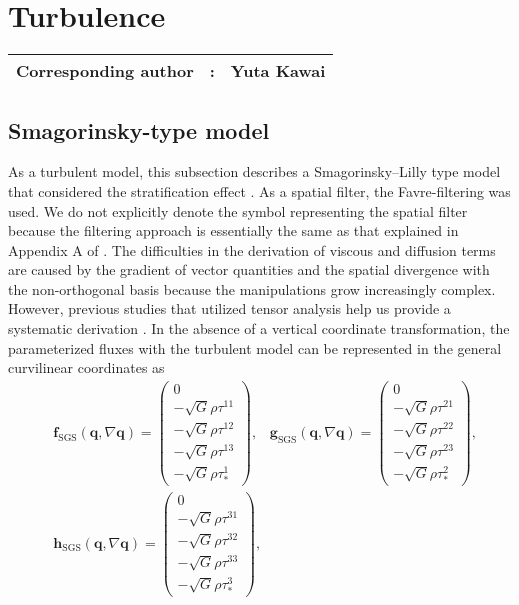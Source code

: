 \section{Turbulence}\label{sec:turbulence}
{\bf \Large
\begin{tabular}{ccc}
\hline
  Corresponding author & : & Yuta Kawai\\
\hline
\end{tabular}
}

\subsection{Smagorinsky-type model}
As a turbulent model, 
this subsection describes 
a Smagorinsky--Lilly type model \citep{smagorinsky1963general,lilly1962numerical} 
that considered the stratification effect \citep{brown1994largeeddy}. 
As a spatial filter, 
the Favre-filtering \citep{favre1983turbulence} was used.  
We do not explicitly denote the symbol representing the spatial filter 
because the filtering approach is essentially the same as that explained in Appendix A of \cite{KT2023NumAccuracyDG}. 
The difficulties in the derivation of viscous and diffusion terms 
are caused by the gradient of vector quantities 
and the spatial divergence with the non-orthogonal basis
because the manipulations grow increasingly complex. 
However, 
previous studies that utilized tensor analysis help us provide a systematic derivation \citep[e.g.,][]{ullrich_global_2014,Rancic2017Nonhydro}. 
In the absence of a vertical coordinate transformation, 
the parameterized fluxes with the turbulent model can be represented in the general curvilinear coordinates as 
\begin{align}    
&\bm{f}_\textrm{SGS}(\bm{q},\nabla \bm{q})
    =\begin{pmatrix}
    0 \\
    -\sqrt{G} \rho \tau^{11}  \\
    -\sqrt{G} \rho \tau^{12}  \\
    -\sqrt{G} \rho \tau^{13}  \\
    -\sqrt{G} \rho \tau_*^1
  \end{pmatrix}, \;\;\;
\bm{g}_\textrm{SGS}(\bm{q},\nabla \bm{q})
    =\begin{pmatrix}
    0 \\
    -\sqrt{G} \rho \tau^{21}  \\
    -\sqrt{G} \rho \tau^{22}  \\
    -\sqrt{G} \rho \tau^{23}  \\
    -\sqrt{G} \rho \tau_*^2
    \end{pmatrix}, \\
&\bm{h}_\textrm{SGS}(\bm{q},\nabla \bm{q})
    =\begin{pmatrix}
    0 \\
    -\sqrt{G} \rho \tau^{31}  \\
    -\sqrt{G} \rho \tau^{32}  \\
    -\sqrt{G} \rho \tau^{33}  \\
    -\sqrt{G} \rho \tau_*^3
    \end{pmatrix}, 
\end{align}
